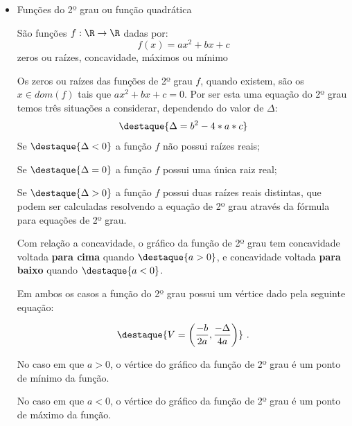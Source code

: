 \begin{itemize}
 \item Funções do 2º grau ou função quadrática

 São funções $f: \R \rightarrow \R$ dadas por:
 \[f(x)= ax^2 + bx + c\]
 {\color{red} zeros ou raízes, concavidade, máximos ou mínimo}

 Os zeros ou raízes das funções de 2º grau $f$, quando existem, são os $x \in dom(f)$ tais que $ax^2+bx+c=0$. Por ser esta uma equação do 2º grau temos três situações a considerar, dependendo do valor de $\Delta$:
 \[\destaque{\Delta= b^2 - 4*a*c}\]
 Se $\destaque{\Delta < 0}$ a função $f$ não possui raízes reais;

 Se $\destaque{\Delta = 0}$ a função $f$ possui uma única raiz real;

 Se $\destaque{\Delta > 0}$ a função $f$ possui duas raízes reais distintas, que podem ser calculadas resolvendo a equação de 2º grau através da fórmula para equações de 2º grau.

 Com relação a concavidade, o gráfico da função de 2º grau tem concavidade voltada \textbf{para cima} quando $\destaque{a > 0}$, e concavidade voltada \textbf{para baixo} quando $\destaque{a < 0}$.

 Em ambos os casos a função do 2º grau possui um vértice dado pela seguinte equação:

 \[ \destaque{V= \left(\frac{- b}{2a}, \frac{- \Delta}{4a} \right)} \ .\]

 No caso em que $a > 0$, o vértice do gráfico da função de 2º grau é um ponto de mínimo da função.

 No caso em que $a < 0$, o vértice do gráfico da função de 2º grau é um ponto de máximo da função.



\end{itemize}
